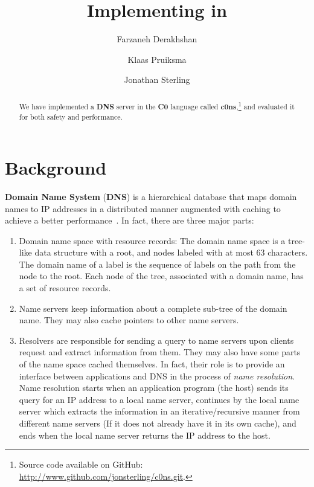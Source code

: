 \documentclass{article}
\title{Implementing \Kwd{DNS} in \Kwd{C0}}
\author{Farzaneh Derakhshan \and Klaas Pruiksma \and Jonathan Sterling}
\newcommand\Kwd[1]{{\sffamily\bfseries{#1}}}
\begin{document}
\maketitle

\begin{abstract}
  We have implemented a \Kwd{DNS} server in the \Kwd{C0} language
  called \Kwd{c0ns},\footnote{Source code available on GitHub:
    \url{http://www.github.com/jonsterling/c0ns.git}.} and evaluated it for
  both safety and performance.
\end{abstract}

\section{Background}


\Kwd{Domain Name System} (\Kwd{DNS}) is a hierarchical database that
maps domain names to IP addresses in a distributed manner augmented
with caching to achieve a better
performance~\citep{rfc:1034,rfc:1035,mun-lee:2005}. In fact, there are
three major parts:

\begin{enumerate}
\item Domain name space with resource records: The domain name space
  is a tree-like data structure with a root, and nodes labeled with at
  most 63 characters. The domain name of a label is the sequence of
  labels on the path from the node to the root. Each node of the tree,
  associated with a domain name, has a set of resource records.

\item Name servers keep information about a complete sub-tree of the
  domain name. They may also cache pointers to other name
  servers.

\item Resolvers are responsible for sending a query to name servers
  upon clients request and extract information from them. They may
  also have some parts of the name space cached themselves.  In fact,
  their role is to provide an interface between applications and DNS
  in the process of \emph{name resolution}. Name resolution starts
  when an application program (the host) sends its query for an IP
  address to a local name server, continues by the local name server
  which extracts the information in an iterative/recursive manner from
  different name servers (If it does not already have it in its own
  cache), and ends when the local name server returns the IP address
  to the host.
\end{enumerate}
\end{document}
